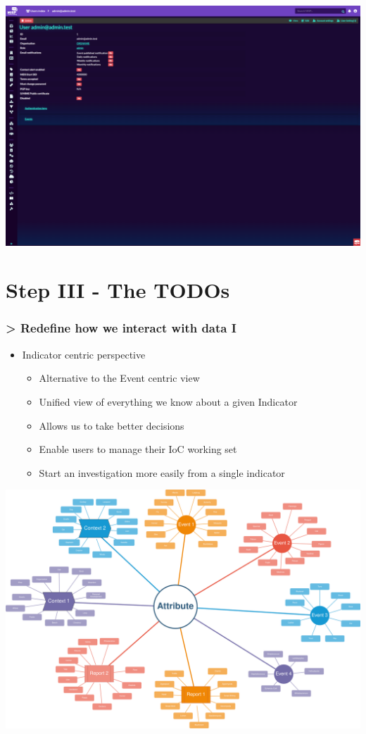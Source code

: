 \begin{frame}
\begin{minipage}{0.5\textwidth}
        \vspace{1em}
        \includegraphics[width=0.9\linewidth]{pictures/theme4.png}
    \end{minipage}
\end{frame}


\section{Step III - The TODOs}
\begin{frame}
    \frametitle{> Redefine how we interact with data I}
    \begin{itemize}
        \item Indicator centric perspective
        \begin{itemize}
            \item Alternative to the Event centric view
            \item Unified view of everything we know about a given Indicator
            \item Allows us to take better decisions
            \item Enable users to manage their IoC working set
            \item Start an investigation more easily from a single indicator
        \end{itemize}
    \end{itemize}
    \begin{center}
        \includegraphics[width=0.7\linewidth]{pictures/attribute-centric.png}
    \end{center}
\end{frame}

